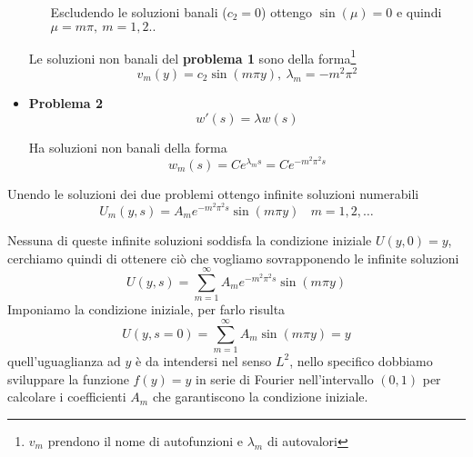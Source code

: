 \begin{itemize}
\begin{itemize}
                    Escludendo le soluzioni banali ($\displaystyle c_{2} =0$) ottengo $\displaystyle \sin(\mu) =0$ e quindi $\displaystyle \mu =m\pi,\ m=1,2..$
          \end{itemize}

          Le soluzioni non banali del \textbf{problema 1} sono della forma\footnote{$\displaystyle v_{m}$ prendono il nome di autofunzioni e $\displaystyle \lambda _{m}$ di autovalori}
          \begin{equation*}
              \boxed{v_{m}(y) =c_{2}\sin(m\pi y),\ \lambda _{m} =-m^{2} \pi ^{2}}
          \end{equation*}

    \item \textbf{Problema 2}
          \begin{equation*}
              w'(s) =\lambda w(s)
          \end{equation*}

          Ha soluzioni non banali della forma
          \begin{equation*}
              \boxed{w_{m}(s) =Ce^{\lambda _{m} s} =Ce^{-m^{2} \pi ^{2} s}}
          \end{equation*}
\end{itemize}

Unendo le soluzioni dei due problemi ottengo infinite soluzioni numerabili
\begin{equation*}
    U_{m}(y,s) =A_{m} e^{-m^{2} \pi ^{2} s}\sin(m\pi y) \ \ \ \ m=1,2,\dotsc
\end{equation*}

Nessuna di queste infinite soluzioni soddisfa la condizione iniziale $U(y,0) =y$, cerchiamo quindi di ottenere ciò che vogliamo sovrapponendo le infinite soluzioni
\begin{equation*}
    \boxed{U(y,s) =\sum\limits ^{\infty }_{m=1} A_{m} e^{-m^{2} \pi ^{2} s}\sin(m\pi y)}
\end{equation*}
Imponiamo la condizione iniziale, per farlo risulta
\begin{equation}
    U(y,s=0) =\sum\limits ^{\infty }_{m=1} A_{m}\sin(m\pi y) =y
    \label{eq:diff-cond-iniziale}
\end{equation}
quell'uguaglianza ad $y$ è da intendersi nel senso $L^{2}$, nello specifico dobbiamo sviluppare la funzione $f(y) =y$ in serie di Fourier nell'intervallo $(0,1)$ per calcolare i coefficienti $A_{m}$ che garantiscono la condizione iniziale.


